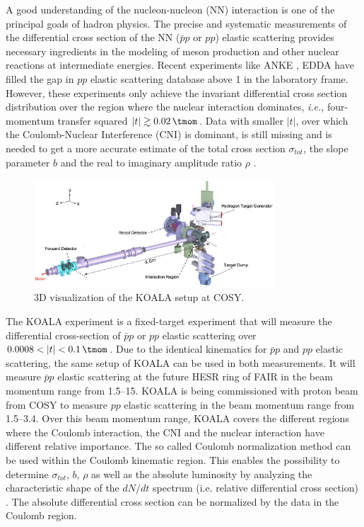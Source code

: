 \documentclass[number,5p]{elsarticle}
\begin{document}
A good understanding of the nucleon-nucleon (NN) interaction is one of the principal goals of hadron physics.
The precise and systematic measurements of the differential cross section of the
NN ($\bar{p}p$ or $pp$) elastic scattering provides necessary ingredients
in the modeling of meson production and other nuclear reactions at intermediate energies.
Recent experiments like ANKE \cite{ANKE}, EDDA \cite{EDDA} have filled the gap
in $pp$ elastic scattering database above \SI{1}{\momentum} in the laboratory frame.
However, these experiments only achieve the invariant differential cross section distribution over the region where the nuclear interaction dominates, 
\textit{i.e.}, four-momentum transfer squared $|t| \gtrsim \SI{0.02}{\tmom}$.
Data with smaller \(|t|\), over which the Coulomb-Nuclear Interference (CNI) is
dominant, is still missing and is needed to get a more accurate estimate of
the total cross section \({\sigma}_{tot}\), the slope parameter \(b\) and the
real to imaginary amplitude ratio \(\rho\) \cite{RevModPhys.57.563}.

\begin{figure}[htbp]
	\centering
	\includegraphics[width=0.8\textwidth]{./koala_setup.png}
	\caption{3D visualization of the KOALA setup at COSY.}
	\label{fig:setup}
\end{figure}

The KOALA experiment is a fixed-target experiment that will measure the
differential cross-section of $\bar{p}p$ or $pp$ elastic scattering
over $0.0008 < |t| < \SI{0.1}{\tmom}$.
Due to the identical kinematics for $\bar{p}p$ and $pp$ elastic scattering, the
same setup of KOALA can be used in both measurements.
It will measure $\bar{p}p$ elastic
scattering at the future HESR ring of FAIR \cite{FAIR} in the beam momentum range from
\SIrange{1.5}{15}{\momentum}.
KOALA is being commissioned with proton beam from COSY \cite{COSY} to measure $pp$ elastic scattering in the beam momentum range from \SIrange{1.5}{3.4}{\momentum}.
Over this beam momentum range, KOALA covers the different regions where the
Coulomb interaction, the CNI and the nuclear interaction have different relative importance.
The so called Coulomb normalization method \cite{bernard1987real,jenni2008atlas}
can be used within the Coulomb kinematic region.
This enables the possibility to determine \({\sigma}_{tot}\), \(b\), \(\rho\) as well as
the absolute luminosity by analyzing the characteristic shape of the $dN/dt$
spectrum (i.e. relative differential cross section) \cite{koala_article}.
The absolute differential cross section can be normalized by the data in the
Coulomb region.
\end{document}
